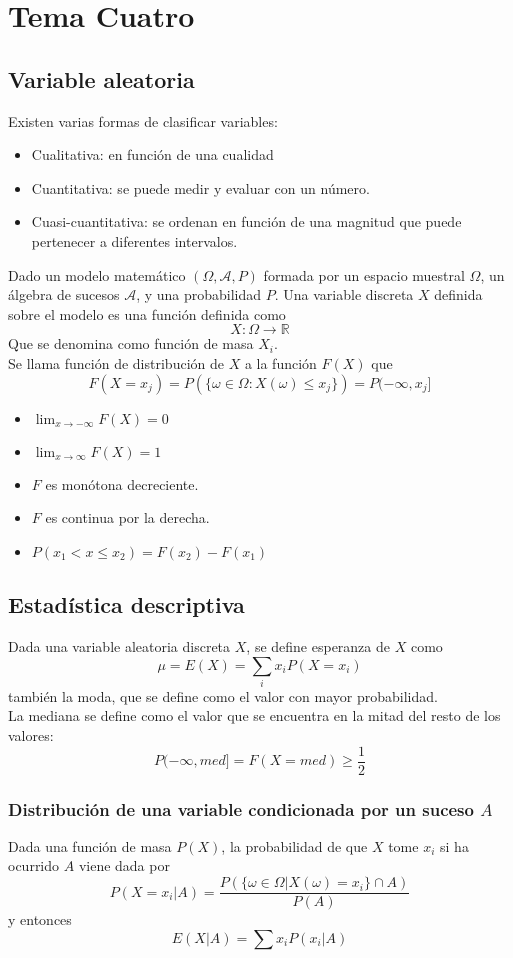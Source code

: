 \documentclass{./Probabilidad.tex}
\begin{document}
\chapter{Tema Cuatro}
\section{Variable aleatoria}
Existen varias formas de clasificar variables:
\begin{itemize}
	\item Cualitativa: en función de una cualidad
	\item Cuantitativa: se puede medir y evaluar con un número.
	\item Cuasi-cuantitativa: se ordenan en función de una magnitud que puede pertenecer a diferentes intervalos.
\end{itemize}
Dado un modelo matemático $(\Omega, \mathcal{A}, P)$ formada por un espacio muestral $\Omega$, un álgebra de sucesos $\mathcal{A}$, y una probabilidad $P$.
Una variable discreta $X$ definida sobre el modelo es una función definida como
$$
X:\Omega\to \mathbb{R}
$$
Que se denomina como función de masa $X_{i}$.\\
Se llama función de distribución de $X$ a la función $F(X)$ que
$$
F(X=x_{j})=P(\{ \omega \in\Omega:X(\omega)\leq x_{j} \})=P(-\infty,x_{j}]
$$
\begin{itemize}
	\item $\lim_{ x \to -\infty }F(X)=0$
	\item $\lim_{ x \to \infty }F(X)=1$
	\item $F$ es monótona decreciente.
	\item $F$ es continua por la derecha.
	\item $P(x_{1}< x\leq x_{2})=F(x_{2})-F(x_{1})$
\end{itemize}
\section{Estadística descriptiva}
Dada una variable aleatoria discreta $X$, se define esperanza de $X$ como
$$
\mu=E(X)=\sum_{i}x_{i}P(X=x_{i})
$$
también la moda, que se define como el valor con mayor probabilidad.\\
La mediana se define como el valor que se encuentra en la mitad del resto de los valores:
$$
P(-\infty, med]=F(X=med) \geq \frac{1}{2}
$$
\pagebreak
\subsection{Distribución de una variable condicionada por un suceso $A$}
Dada una función de masa $P(X)$, la probabilidad de que $X$ tome $x_{i}$ si ha ocurrido $A$ viene dada por
$$
P(X=x_{i}|A)=\frac{P(\{ \omega \in \Omega|X(\omega)=x_{i} \}\cap A)}{P(A)}
$$
y entonces
$$
E(X|A)=\sum x_{i}P(x_{i}|A)
$$
\end{document}
